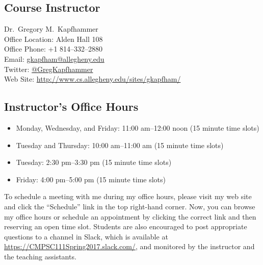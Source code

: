 

\usepackage[compact]{titlesec}




\vspace*{-.1in}
\subsection*{Course Instructor}
Dr.\ Gregory M.\ Kapfhammer\\
\noindent Office Location: Alden Hall 108 \\
\noindent Office Phone: +1 814--332--2880 \\
\noindent Email: \url{gkapfham@allegheny.edu} \\
\noindent Twitter: \url{@GregKapfhammer} \\
\noindent Web Site: \url{http://www.cs.allegheny.edu/sites/gkapfham/}

\subsection*{Instructor's Office Hours}

\begin{itemize}
  \itemsep0em

  \item Monday, Wednesday, and Friday: 11:00 am--12:00 noon (15 minute time slots)

  \item Tuesday and Thursday: 10:00 am--11:00 am (15 minute time slots)

  \item Tuesday: 2:30 pm--3:30 pm (15 minute time slots)

  \item Friday: 4:00 pm--5:00 pm (15 minute time slots)

\end{itemize}

\vspace*{-.1in}

\noindent To schedule a meeting with me during my office hours, please visit my web site and click the ``Schedule'' link
in the top right-hand corner. Now, you can browse my office hours or schedule an appointment by clicking the correct
link and then reserving an open time slot. Students are also encouraged to post appropriate questions to a channel in
Slack, which is available at \url{https://CMPSC111Spring2017.slack.com/}, and monitored by the instructor and the
teaching assistants.

